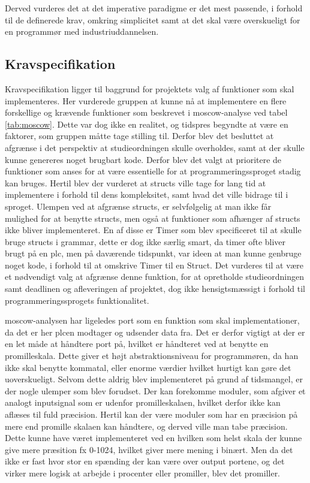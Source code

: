 Derved vurderes det at det imperative paradigme er det mest passende, i forhold til de definerede krav, omkring simplicitet samt at det skal være overskueligt for en programmør med industriuddannelsen.

\subsection*{Kravspecifikation}
Kravspecifikation ligger til baggrund for projektets valg af funktioner som skal implementeres.
Her vurderede gruppen at kunne nå at implementere en flere forskellige og krævende funktioner som beskrevet i \gls{moscow}-analyse ved tabel \ref{tab:moscow}.
Dette var dog ikke en realitet, og tidspres begyndte at være en faktorer, som gruppen måtte tage stilling til.
Derfor blev det besluttet at afgrænse i det perspektiv at studieordningen skulle overholdes, samt at der skulle kunne genereres noget brugbart kode.
Derfor blev det valgt at prioritere de funktioner som anses for at være essentielle for at programmeringssproget stadig kan bruges. Hertil blev der vurderet at structs ville tage for lang tid at implementere i forhold til dens kompleksitet, samt hvad det ville bidrage til i sproget.
Ulempen ved at afgrænse structs, er selvfølgelig at man ikke får mulighed for at benytte structs, men også at funktioner som afhænger af structs ikke bliver implementeret.
En af disse er Timer som blev specificeret til at skulle bruge structs i grammar, dette er dog ikke særlig smart, da timer ofte bliver brugt på en \gls{plc}, men på daværende tidspunkt, var ideen at man kunne genbruge noget kode, i forhold til at omskrive Timer til en Struct.
Det vurderes til at være et nødvendigt valg at afgrænse denne funktion, for at opretholde studieordningen samt deadlinen og afleveringen af projektet, dog ikke hensigtsmæssigt i forhold til programmeringssprogets funktionalitet.

\gls{moscow}-analysen har ligeledes port som en funktion som skal implementationer, da det er her \gls{plc}en modtager og udsender data fra.
Det er derfor vigtigt at der er en let måde at håndtere port på, hvilket er håndteret ved at benytte en promilleskala.
Dette giver et højt abstraktionsniveau for programmøren, da han ikke skal benytte kommatal, eller enorme værdier hvilket hurtigt kan gøre det uoverskueligt.
Selvom dette aldrig blev implementeret på grund af tidsmangel, er der nogle ulemper som blev forudset.
Der kan forekomme moduler, som afgiver et analogt inputsignal som er udenfor promilleskalaen, hvilket derfor ikke kan aflæses til fuld præcision. 
Hertil kan der være moduler som har en præcision på mere end promille skalaen kan håndtere, og derved ville man tabe præcision.
Dette kunne have været implementeret ved en hvilken som helst skala der kunne give mere præsition fx 0-1024, hvilket giver mere mening i binært. Men da det ikke er fast hvor stor en spænding der kan være over output portene, og det virker mere logisk at arbejde i procenter eller promiller, blev det promiller. 

